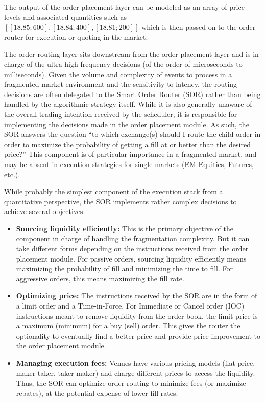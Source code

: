 The output of the order placement layer can be modeled as an array of price levels and associated quantities such as $[ [18.85 ; 600], [18.84 ; 400], [18.81 ; 200] ]$ which is then passed on to the order router for execution or quoting in the market.


The order routing layer sits downstream from the order placement layer and is in charge of the ultra high-frequency decisions (of the order of microseconds to milliseconds). Given the volume and complexity of events to process in a fragmented market environment and the sensitivity to latency, the routing decisions are often delegated to the Smart Order Router (SOR) rather than being handled by the algorithmic strategy itself. While it is also generally unaware of the overall trading intention received by the scheduler, it is responsible for implementing the decisions made in the order placement module. As such, the SOR answers the question ``to which exchange(s) should I route the child order in order to maximize the probability of getting a fill at or better than the desired price?'' This component is of particular importance in a fragmented market, and may be absent in execution strategies for single markets (EM Equities, Futures, etc.). 


While probably the simplest component of the execution stack from a quantitative perspective, the SOR implements rather complex decisions to achieve several objectives: 

\begin{itemize}
\item \textbf{Sourcing liquidity efficiently:} This is the primary objective of the component in charge of handling the fragmentation complexity. But it can take different forms depending on the instructions received from the order placement module. For passive orders, sourcing liquidity efficiently means maximizing the probability of fill and minimizing the time to fill. For aggressive orders, this means maximizing the fill rate.

\item \textbf{Optimizing price:} The instructions received by the SOR are in the form of a limit order and a Time-in-Force. For Immediate or Cancel order (IOC) instructions meant to remove liquidity from the order book, the limit price is a maximum (minimum) for a buy (sell) order. This gives the router the optionality to eventually find a better price and provide price improvement to the order placement module.

\item \textbf{Managing execution fees:} Venues have various pricing models (flat price, maker-taker, taker-maker) and charge different prices to access the liquidity. Thus, the SOR can optimize order routing to minimize fees (or maximize rebates), at the potential expense of lower fill rates.
\end{itemize}


